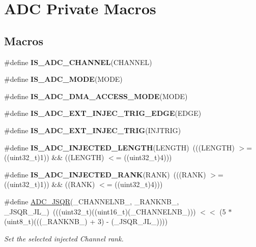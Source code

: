 \hypertarget{group___a_d_c_ex___private___macros}{}\section{A\+DC Private Macros}
\label{group___a_d_c_ex___private___macros}
\subsection*{Macros}
\begin{DoxyCompactItemize}
\item 
\#define {\bfseries I\+S\+\_\+\+A\+D\+C\+\_\+\+C\+H\+A\+N\+N\+EL}(C\+H\+A\+N\+N\+EL)
\item 
\#define {\bfseries I\+S\+\_\+\+A\+D\+C\+\_\+\+M\+O\+DE}(M\+O\+DE)
\item 
\#define {\bfseries I\+S\+\_\+\+A\+D\+C\+\_\+\+D\+M\+A\+\_\+\+A\+C\+C\+E\+S\+S\+\_\+\+M\+O\+DE}(M\+O\+DE)
\item 
\#define {\bfseries I\+S\+\_\+\+A\+D\+C\+\_\+\+E\+X\+T\+\_\+\+I\+N\+J\+E\+C\+\_\+\+T\+R\+I\+G\+\_\+\+E\+D\+GE}(E\+D\+GE)
\item 
\#define {\bfseries I\+S\+\_\+\+A\+D\+C\+\_\+\+E\+X\+T\+\_\+\+I\+N\+J\+E\+C\+\_\+\+T\+R\+IG}(I\+N\+J\+T\+R\+IG)
\item 
\#define {\bfseries I\+S\+\_\+\+A\+D\+C\+\_\+\+I\+N\+J\+E\+C\+T\+E\+D\+\_\+\+L\+E\+N\+G\+TH}(L\+E\+N\+G\+TH)~(((L\+E\+N\+G\+TH) $>$= ((uint32\+\_\+t)1)) \&\& ((L\+E\+N\+G\+TH) $<$= ((uint32\+\_\+t)4)))\hypertarget{group___a_d_c_ex___private___macros_gaecdddab7424a697722683296ca70e176}{}\label{group___a_d_c_ex___private___macros_gaecdddab7424a697722683296ca70e176}

\item 
\#define {\bfseries I\+S\+\_\+\+A\+D\+C\+\_\+\+I\+N\+J\+E\+C\+T\+E\+D\+\_\+\+R\+A\+NK}(R\+A\+NK)~(((R\+A\+NK) $>$= ((uint32\+\_\+t)1)) \&\& ((R\+A\+NK) $<$= ((uint32\+\_\+t)4)))\hypertarget{group___a_d_c_ex___private___macros_ga63f95f9a45f4d718aabc9e429d860e9d}{}\label{group___a_d_c_ex___private___macros_ga63f95f9a45f4d718aabc9e429d860e9d}

\item 
\#define \hyperlink{group___a_d_c_ex___private___macros_gaa40c3e803cf20a8aebc3735a714606ad}{A\+D\+C\+\_\+\+J\+S\+QR}(\+\_\+\+C\+H\+A\+N\+N\+E\+L\+N\+B\+\_\+,  \+\_\+\+R\+A\+N\+K\+N\+B\+\_\+,  \+\_\+\+J\+S\+Q\+R\+\_\+\+J\+L\+\_\+)~(((uint32\+\_\+t)((uint16\+\_\+t)(\+\_\+\+C\+H\+A\+N\+N\+E\+L\+N\+B\+\_\+))) $<$$<$ (5 $\ast$ (uint8\+\_\+t)(((\+\_\+\+R\+A\+N\+K\+N\+B\+\_\+) + 3) -\/ (\+\_\+\+J\+S\+Q\+R\+\_\+\+J\+L\+\_\+))))
\begin{DoxyCompactList}\small\item\em Set the selected injected Channel rank. \end{DoxyCompactList}\end{DoxyCompactItemize}


